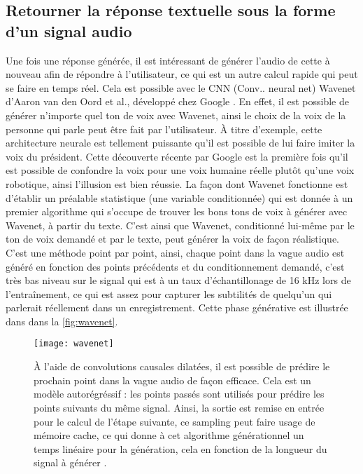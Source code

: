 \subsection{Retourner la réponse textuelle sous la forme d'un signal audio}
Une fois une réponse générée, il est intéressant de générer l’audio de cette à nouveau afin de répondre à l’utilisateur, ce qui est un autre calcul rapide qui peut se faire en temps réel. Cela est possible avec le CNN (Conv.. neural net) Wavenet d’Aaron van den Oord et al., développé chez Google \cite{wavenet}. En effet, il est possible de générer n’importe quel ton de voix avec Wavenet, ainsi le choix de la voix de la personne qui parle peut être fait par l’utilisateur. À titre d’exemple, cette architecture neurale est tellement puissante qu’il est possible de lui faire imiter la voix du président. Cette découverte récente par Google est la première fois qu’il est possible de confondre la voix pour une voix humaine réelle plutôt qu’une voix robotique, ainsi l’illusion est bien réussie. La façon dont Wavenet fonctionne est d’établir un préalable statistique (une variable conditionnée) qui est donnée à un premier algorithme qui s’occupe de trouver les bons tons de voix à générer avec Wavenet, à partir du texte. C’est ainsi que Wavenet, conditionné lui-même par le ton de voix demandé et par le texte, peut générer la voix de façon réalistique. C’est une méthode point par point, ainsi, chaque point dans la vague audio est généré en fonction des points précédents et du conditionnement demandé, c’est très bas niveau sur le signal qui est à un taux d’échantillonage de 16 kHz lors de l’entraînement, ce qui est assez pour capturer les subtilités de quelqu’un qui parlerait réellement dans un enregistrement. Cette phase générative est illustrée dans dans la \autoref{fig:wavenet}.

\begin{figure*}
  \centering
  \texttt{[image: wavenet]}
  \caption{À l’aide de convolutions causales dilatées, il est possible de prédire le prochain point dans la vague audio de façon efficace. Cela est un modèle autorégréssif : les points passés sont utilisés pour prédire les points suivants du même signal. Ainsi, la sortie est remise en entrée pour le calcul de l’étape suivante, ce sampling peut faire usage de mémoire cache, ce qui donne à cet algorithme générationnel un temps linéaire pour la génération, cela en fonction de la longueur du signal à générer \cite{wavenet}.}
  \label{fig:wavenet}
\end{figure*}
